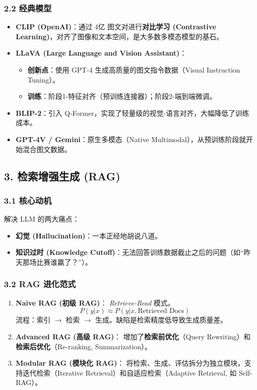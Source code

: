 \documentclass[a4paper, 11pt]{ctexart}
\begin{document}
\subsubsection{2.2 经典模型}
\begin{itemize}
    \item \textbf{CLIP (OpenAI)}：通过 4亿 图文对进行\textbf{对比学习 (Contrastive Learning)}，对齐了图像和文本空间，是大多数多模态模型的基石。
    \item \textbf{LLaVA (Large Language and Vision Assistant)}：
    \begin{itemize}
        \item \textbf{创新点}：使用 GPT-4 生成高质量的图文指令数据（Visual Instruction Tuning）。
        \item \textbf{训练}：阶段1-特征对齐（预训练连接器）；阶段2-端到端微调。
    \end{itemize}
    \item \textbf{BLIP-2}：引入 Q-Former，实现了轻量级的视觉-语言对齐，大幅降低了训练成本。
    \item \textbf{GPT-4V / Gemini}：原生多模态（Native Multimodal），从预训练阶段就开始混合图文数据。
\end{itemize}

\subsection{3. 检索增强生成 (RAG)}

\subsubsection{3.1 核心动机}
解决 LLM 的两大痛点：
\begin{itemize}
    \item \textbf{幻觉 (Hallucination)}：一本正经地胡说八道。
    \item \textbf{知识过时 (Knowledge Cutoff)}：无法回答训练数据截止之后的问题（如“昨天那场比赛谁赢了？”）。
\end{itemize}

\subsubsection{3.2 RAG 进化范式}
\begin{enumerate}
    \item \textbf{Naive RAG (初级 RAG)}：
    \textit{Retrieve-Read} 模式。
    $$ P(y|x) \approx P(y|x, \text{Retrieved Docs}) $$
    流程：索引 $\to$ 检索 $\to$ 生成。缺陷是检索精度低导致生成质量差。
    \item \textbf{Advanced RAG (高级 RAG)}：
    增加了\textbf{检索前优化}（Query Rewriting）和\textbf{检索后优化}（Re-ranking, Summarization）。
    \item \textbf{Modular RAG (模块化 RAG)}：
    将检索、生成、评估拆分为独立模块，支持迭代检索（Iterative Retrieval）和自适应检索（Adaptive Retrieval, 如 Self-RAG）。
\end{enumerate}
\end{document}
